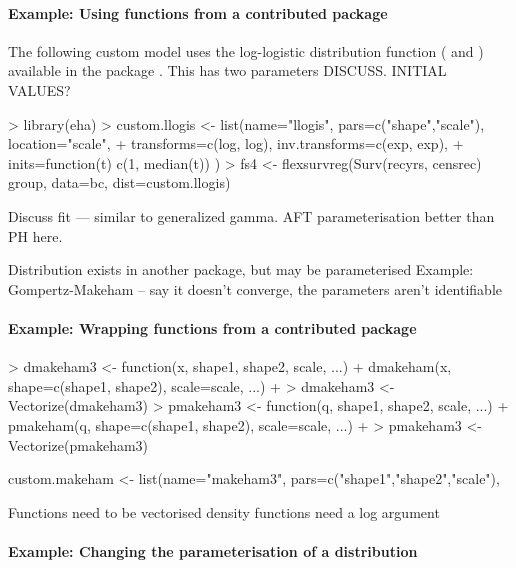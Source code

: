 \documentclass[nojss,nofooter]{jss}
\begin{document}
\paragraph{Example: Using functions from a contributed package}

The following custom model uses the log-logistic distribution function
( and ) available in the package
.   This has two parameters DISCUSS.   INITIAL VALUES?
\begin{Schunk}
\begin{Sinput}
> library(eha)
> custom.llogis <- list(name="llogis",  pars=c("shape","scale"), location="scale",
+                       transforms=c(log, log), inv.transforms=c(exp, exp),
+                       inits=function(t){ c(1, median(t)) })
> fs4 <- flexsurvreg(Surv(recyrs, censrec) ~ group, data=bc, dist=custom.llogis)
\end{Sinput}
\end{Schunk}

Discuss fit --- similar to generalized gamma.  AFT parameterisation
better than PH here.

Distribution exists in another package, but may be parameterised 
Example: Gompertz-Makeham -- say it doesn't converge, the parameters aren't identifiable 

\paragraph{Example: Wrapping functions from a contributed package}

\begin{Schunk}
\begin{Sinput}
> dmakeham3 <- function(x, shape1, shape2, scale, ...)  {
+     dmakeham(x, shape=c(shape1, shape2), scale=scale, ...)
+ }
> dmakeham3 <- Vectorize(dmakeham3) 
> pmakeham3 <- function(q, shape1, shape2, scale, ...)  {
+     pmakeham(q, shape=c(shape1, shape2), scale=scale, ...)
+ }
> pmakeham3 <- Vectorize(pmakeham3)
\end{Sinput}
\end{Schunk}
\begin{Scode}
custom.makeham <- list(name="makeham3",
                       pars=c("shape1","shape2","scale"),
\end{Scode}

Functions need to be vectorised 
density functions need a log argument

\paragraph{Example: Changing the parameterisation of a distribution}
\end{document}
